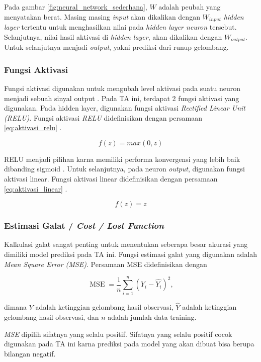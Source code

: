     Pada gambar \ref{fig:neural_network_sederhana}, $W$ adalah peubah yang menyatakan berat. Masing masing \emph{input} akan dikalikan dengan $W_{input}$ \emph{hidden layer} tertentu untuk menghasilkan nilai pada \emph{hidden layer neuron} tersebut. Selanjutnya, nilai hasil aktivasi di \emph{hidden layer}, akan dikalikan dengan $W_{output}$. Untuk selanjutnya menjadi \emph{output}, yakni prediksi dari runup gelombang.

\subsubsection{Fungsi Aktivasi}
    Fungsi aktivasi digunakan untuk mengubah level aktivasi pada suatu neuron menjadi sebuah sinyal output \cite{KarlicOlgacPerformanceAnalysis}. Pada TA ini, terdapat 2 fungsi aktivasi yang digunakan. Pada hidden layer, digunakan fungsi aktivasi \emph{Rectified Linear Unit (RELU)}. Fungsi aktivasi \emph{RELU} didefinisikan dengan persamaan \ref{eq:aktivasi_relu} \cite{glorot2011deep}.

    \begin{equation}
        f(z) = max(0, z)
        \label{eq:aktivasi_relu}
    \end{equation}

    RELU menjadi pilihan karna memiliki performa konvergensi yang lebih baik dibanding sigmoid \cite{Krizhevsky:2012:ICD:2999134.2999257}. Untuk selanjutnya, pada neuron \emph{output}, digunakan fungsi aktivasi linear. Fungsi aktivasi linear didefinisikan dengan persamaan \ref{eq:aktivasi_linear} \cite{MLBishop}.

    \begin{equation}
        f(z) = z
        \label{eq:aktivasi_linear}
    \end{equation}

\subsubsection{Estimasi Galat / \emph{Cost / Lost Function}}
    Kalkulasi galat sangat penting untuk menentukan seberapa besar akurasi yang dimiliki model prediksi pada TA ini. Fungsi estimasi galat yang digunakan adalah \emph{Mean Square Error (MSE)}. Persamaan MSE didefinisikan dengan

    \begin{equation}
        \operatorname{MSE}=\frac{1}{n}\sum_{i=1}^n(Y_i-\hat{Y_i})^2,
    \end{equation}

    dimana $Y$ adalah ketinggian gelombang hasil observasi, $\hat{Y}$ adalah ketinggian gelombang hasil observasi, dan $n$ adalah jumlah data training.

    \emph{MSE} dipilih sifatnya yang selalu positif. Sifatnya yang selalu positif cocok digunakan pada TA ini karna prediksi pada model yang akan dibuat bisa berupa bilangan negatif.
